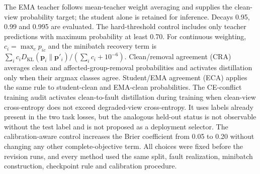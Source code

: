 \documentclass[10pt]{article}
\begin{document}
The EMA teacher follows mean-teacher weight averaging and supplies the clean-view probability target; the student alone is retained for inference. Decays 0.95, 0.99 and 0.995 are evaluated. The hard-threshold control includes only teacher predictions with maximum probability at least 0.70. For continuous weighting, $c_i=\max_c p_{ic}$ and the minibatch recovery term is $\sum_i c_iD_{\mathrm{KL}}(\mathbf p_i\|\mathbf p'_i)/(\sum_i c_i+10^{-6})$. Clean/removal agreement (CRA) averages clean and affected-group-removal probabilities and activates distillation only when their argmax classes agree. Student/EMA agreement (ECA) applies the same rule to student-clean and EMA-clean probabilities. The CE-conflict training audit activates clean-to-fault distillation during training when clean-view cross-entropy does not exceed degraded-view cross-entropy. It uses labels already present in the two task losses, but the analogous held-out status is not observable without the test label and is not proposed as a deployment selector. The calibration-aware control increases the Brier coefficient from 0.05 to 0.20 without changing any other complete-objective term. All choices were fixed before the revision runs, and every method used the same split, fault realization, minibatch construction, checkpoint rule and calibration procedure.

\begin{table}[H]
\centering
\caption{Strong-baseline, teacher and calibration controls under the unique chemical headline fault. Values are means across 10 matched optimization seeds after per-seed temperature scaling. These seeds are repeated fits, not devices.}
\label{tab:supp-strong-controls}
\resizebox{\textwidth}{!}{}
\end{table}

\begin{table}[H]
\centering
\caption{Published/adapted baselines and teacher controls under the principal fault. The Role column distinguishes comparison baselines, the practical default, mechanistic full model, calibration sensitivity and diagnostic audits. QMF-PD is the official-rule-aligned sensor-group adaptation; CRA and ECA denote clean/removal agreement and student/EMA agreement. The CE-conflict training audit is label-assisted and training-only. Lite adds clean recovery distillation; Full additionally adds the Brier, ranking and response-interior auxiliaries. Lite, Full, EMA and all teacher controls use the same checkpoint criterion.}
\label{tab:supp-major7-controls}
\resizebox{\textwidth}{!}{}
\end{table}
\end{document}
